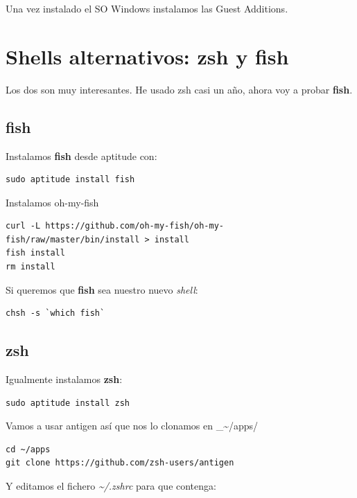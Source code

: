\documentclass[12pt,spanish,]{scrartcl}
\begin{document}
Una vez instalado el SO Windows instalamos las Guest Additions.

\section{Shells alternativos: zsh y
fish}\label{shells-alternativos-zsh-y-fish}

Los dos son muy interesantes. He usado zsh casi un año, ahora voy a
probar \textbf{fish}.

\subsection{fish}\label{fish}

Instalamos \textbf{fish} desde aptitude con:

\begin{verbatim}
sudo aptitude install fish
\end{verbatim}

Instalamos oh-my-fish

\begin{verbatim}
curl -L https://github.com/oh-my-fish/oh-my-fish/raw/master/bin/install > install
fish install
rm install
\end{verbatim}

Si queremos que \textbf{fish} sea nuestro nuevo \emph{shell}:

\begin{verbatim}
chsh -s `which fish`
\end{verbatim}

\subsection{zsh}\label{zsh}

Igualmente instalamos \textbf{zsh}:

\begin{verbatim}
sudo aptitude install zsh
\end{verbatim}

Vamos a usar antigen así que nos lo clonamos en
\_\textasciitilde{}/apps/

\begin{verbatim}
cd ~/apps
git clone https://github.com/zsh-users/antigen
\end{verbatim}

Y editamos el fichero \emph{\textasciitilde{}/.zshrc} para que contenga:
\end{document}
